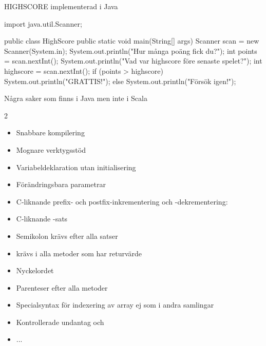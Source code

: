 \begin{Slide}{HIGHSCORE implementerad i Java}
\begin{Code}[language=Java]
import java.util.Scanner;

public class HighScore {
    public static void main(String[] args){
        Scanner scan = new Scanner(System.in);
        System.out.println("Hur många poäng fick du?");
        int points =  scan.nextInt();
        System.out.println("Vad var highscore före senaste spelet?");
        int highscore = scan.nextInt();
        if (points > highscore) {
            System.out.println("GRATTIS!");
        } else {
            System.out.println("Försök igen!");
        }
    }
}
\end{Code}
\end{Slide}


\begin{Slide}{Några saker som finns i Java men inte i Scala}
\ifkompendium\else
\vspace{-0.7em}\begin{multicols}{2}\SlideFontTiny
\fi
\begin{itemize}
\item[\textbf{\texttt{+}}] Snabbare kompilering

\item[\textbf{\texttt{+}}] Mognare verktygsstöd

\item Variabeldeklaration utan initialisering

\item Förändringsbara parametrar

\item C-liknande prefix- och postfix-inkrementering och -dekrementering: 

\item C-liknande -sats

\item Semikolon krävs efter alla satser

\item {} krävs i alla metoder som har returvärde

\item Nyckelordet 

\item Parenteser efter alla metoder

\item Specialsyntax för indexering av array \code{[]} ej som i andra samlingar

\item Kontrollerade undantag  och 

\item ...
\end{itemize}
\ifkompendium\else
\end{multicols}
\fi
\end{Slide}



